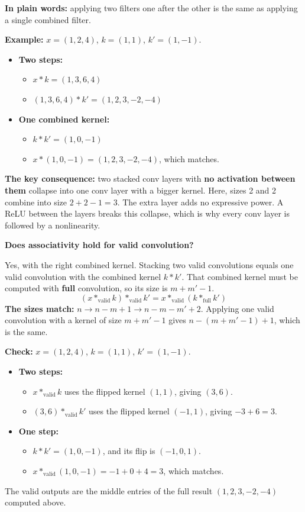 \textbf{In plain words:} applying two filters one after the other is the same as applying a single combined filter.

\textbf{Example:} $x = (1, 2, 4)$, $k = (1, 1)$, $k' = (1, -1)$.
\begin{itemize}
  \item \textbf{Two steps:}
  \begin{itemize}
    \item $x * k = (1, 3, 6, 4)$
    \item $(1, 3, 6, 4) * k' = (1, 2, 3, -2, -4)$
  \end{itemize}
  \item \textbf{One combined kernel:}
  \begin{itemize}
    \item $k * k' = (1, 0, -1)$
    \item $x * (1, 0, -1) = (1, 2, 3, -2, -4)$, which matches.
  \end{itemize}
\end{itemize}
\textbf{The key consequence:} two stacked conv layers with \textbf{no activation between them} collapse into one conv layer with a bigger kernel. Here, sizes 2 and 2 combine into size $2 + 2 - 1 = 3$. The extra layer adds no expressive power. A ReLU between the layers breaks this collapse, which is why every conv layer is followed by a nonlinearity.

\textbf{Does associativity hold for valid convolution?}

Yes, with the right combined kernel. Stacking two valid convolutions equals one valid convolution with the combined kernel $k * k'$. That combined kernel must be computed with \textbf{full} convolution, so its size is $m + m' - 1$.
\[
(x *_{\text{valid}} k) *_{\text{valid}} k' = x *_{\text{valid}} (k *_{\text{full}} k')
\]
\textbf{The sizes match:} $n \to n - m + 1 \to n - m - m' + 2$. Applying one valid convolution with a kernel of size $m + m' - 1$ gives $n - (m + m' - 1) + 1$, which is the same.

\textbf{Check:} $x = (1, 2, 4)$, $k = (1, 1)$, $k' = (1, -1)$.
\begin{itemize}
  \item \textbf{Two steps:}
  \begin{itemize}
    \item $x *_{\text{valid}} k$ uses the flipped kernel $(1, 1)$, giving $(3, 6)$.
    \item $(3, 6) *_{\text{valid}} k'$ uses the flipped kernel $(-1, 1)$, giving $-3 + 6 = 3$.
  \end{itemize}
  \item \textbf{One step:}
  \begin{itemize}
    \item $k * k' = (1, 0, -1)$, and its flip is $(-1, 0, 1)$.
    \item $x *_{\text{valid}} (1, 0, -1) = -1 + 0 + 4 = 3$, which matches.
  \end{itemize}
\end{itemize}
The valid outputs are the middle entries of the full result $(1, 2, 3, -2, -4)$ computed above.

